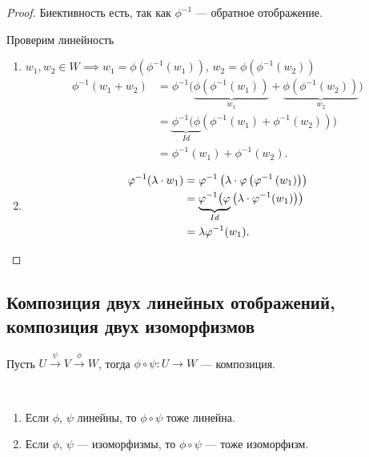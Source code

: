 \begin{proof}
    Биективность есть, так как $\phi^{-1}$ --- обратное отображение.

    Проверим линейность
    \begin{enumerate}[label=\arabic*)]
    \item $w_1, w_2 \in W \implies w_1 = \phi(\phi^{-1}(w_1))$, $w_2 = \phi(\phi^{-1}(w_2))$
        \begin{align*}
            \phi^{-1}(w_1 + w_2) &= \phi^{-1}\Big(\underbrace{\phi\left(\phi^{-1}(w_1)\right)}_{w_1} + \underbrace{\phi\left(\phi^{-1}(w_2)\right)}_{w_2}\Big) \\
            &= \underbrace{\phi^{-1}\big(\phi}_{Id}\left(\phi^{-1}(w_1) + \phi^{-1}(w_2)\right)\!\big)\\
            &= \phi^{-1}(w_1) + \phi^{-1}(w_2)
        .\end{align*}

    \item 
        \begin{align*}
            \phi^{-1}(\lambda \cdot w_1) &= \phi^{-1}\left(\lambda \cdot \phi\left(\phi^{-1}\left(w_1\right)\right)\right) \\
            &= \underbrace{\phi^{-1}\big(\phi}_{Id}\left(\lambda \cdot \phi^{-1}(w_1)\right)\!\big) \\
            &= \lambda \phi^{-1}(w_1)
        .\qedhere\end{align*}
    \end{enumerate}
\end{proof}


\subsection{Композиция двух линейных отображений, композиция двух изоморфизмов}

Пусть $U \xrightarrow{\psi} V \xrightarrow{\phi} W$, тогда $\phi \circ \psi : U \to W$ --- композиция.

\begin{proposal}~
    \label{lec16:prop_2}
    \begin{enumerate}[nosep]
    \item Если $\phi$, $\psi$ линейны, то $\phi \circ \psi$ тоже линейна.
    \item Если $\phi$, $\psi$ --- изоморфизмы, то $\phi \circ \psi$ --- тоже изоморфизм.
    \end{enumerate}
\end{proposal}

